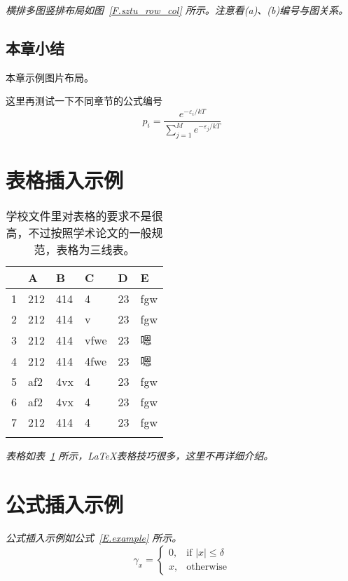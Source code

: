 \emph{横排多图竖排布局如图~\ref{F.sztu_row_col} 所示。注意看(a)、(b)编号与图关系。}

\subsection{本章小结}
本章示例图片布局。

这里再测试一下不同章节的公式编号
\begin{equation}
p_{i} = \frac{e^{-\varepsilon_{i}/kT}}{\sum_{j=1}^{M}e^{-\varepsilon_{j}/kT}}
\end{equation}



\section{表格插入示例}

\begin{table}[htb]
  \centering
  \caption{学校文件里对表格的要求不是很高，不过按照学术论文的一般规范，表格为三线表。}
  \label{T.example}
  \begin{tabular}{llllll}
  \hline
   & A  & B  & C  & D  & E \\
  \hline
1 	& 212 & 414 & 4 		& 23 & fgw	\\
2 	& 212 & 414 & v 		& 23 & fgw	\\
3 	& 212 & 414 & vfwe		& 23 & 嗯	\\
4 	& 212 & 414 & 4fwe		& 23 & 嗯	\\
5 	& af2 & 4vx & 4 		& 23 & fgw	\\
6 	& af2 & 4vx & 4 		& 23 & fgw	\\
7 	& 212 & 414 & 4 		& 23 & fgw	\\

\hline{}
\end{tabular}
\end{table}

\emph{表格如表~\ref{T.example} 所示，\LaTeX 表格技巧很多，这里不再详细介绍。}

\lipsum


\section{公式插入示例}

\lipsum

\emph{公式插入示例如公式~\eqref{E.example} 所示。}
\begin{equation}
\gamma_x=
\begin{cases}
  0, & \text{if $|x| \leq \delta$} \\
  x, & \text{otherwise}
\end{cases}
\label{E.example}
\end{equation}


